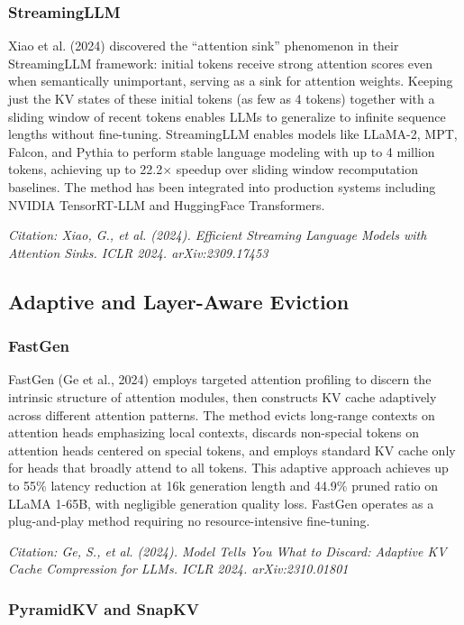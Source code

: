 \documentclass[11pt,letterpaper]{article}
\begin{document}
\subsubsection{StreamingLLM}

Xiao et al. (2024) discovered the ``attention sink'' phenomenon in their StreamingLLM framework: initial tokens receive strong attention scores even when semantically unimportant, serving as a sink for attention weights. Keeping just the KV states of these initial tokens (as few as 4 tokens) together with a sliding window of recent tokens enables LLMs to generalize to infinite sequence lengths without fine-tuning. StreamingLLM enables models like LLaMA-2, MPT, Falcon, and Pythia to perform stable language modeling with up to 4 million tokens, achieving up to 22.2$\times$ speedup over sliding window recomputation baselines. The method has been integrated into production systems including NVIDIA TensorRT-LLM and HuggingFace Transformers.

\textit{Citation: Xiao, G., et al. (2024). Efficient Streaming Language Models with Attention Sinks. ICLR 2024. arXiv:2309.17453}

\subsection{Adaptive and Layer-Aware Eviction}

\subsubsection{FastGen}

FastGen (Ge et al., 2024) employs targeted attention profiling to discern the intrinsic structure of attention modules, then constructs KV cache adaptively across different attention patterns. The method evicts long-range contexts on attention heads emphasizing local contexts, discards non-special tokens on attention heads centered on special tokens, and employs standard KV cache only for heads that broadly attend to all tokens. This adaptive approach achieves up to 55\% latency reduction at 16k generation length and 44.9\% pruned ratio on LLaMA 1-65B, with negligible generation quality loss. FastGen operates as a plug-and-play method requiring no resource-intensive fine-tuning.

\textit{Citation: Ge, S., et al. (2024). Model Tells You What to Discard: Adaptive KV Cache Compression for LLMs. ICLR 2024. arXiv:2310.01801}

\subsubsection{PyramidKV and SnapKV}
\end{document}
